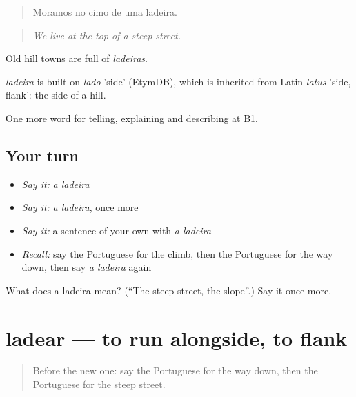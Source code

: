 \begin{quote}
Moramos no cimo de uma ladeira.
\end{quote}

\begin{quote}
\emph{We live at the top of a steep street.}
\end{quote}

Old hill towns are full of \emph{ladeiras}.

\begin{cousinweb}
\emph{ladeira} is built on \emph{lado} 'side' (EtymDB), which is inherited from Latin \emph{latus} 'side, flank': the side of a hill.
\end{cousinweb}

\begin{grammarlens}[title={What you've built}]
One more word for telling, explaining and describing at B1.
\end{grammarlens}

\subsection*{Your turn}
\begin{itemize}
\raggedright
  \item \emph{Say it:} \emph{a ladeira}
  \item \emph{Say it:} \emph{a ladeira}, once more
  \item \emph{Say it:} a sentence of your own with \emph{a ladeira}
  \item \emph{Recall:} say the Portuguese for the climb, then the Portuguese for the way down, then say \emph{a ladeira} again
\end{itemize}

\begin{tcolorbox}[breakable,colback=teal!4,colframe=teal!35!black,title={Before you move on}]
What does a ladeira mean? (\textquotedblleft{}The steep street, the slope\textquotedblright{}.) Say it once more.
\end{tcolorbox}
\section[ladear]{ladear — to run alongside, to flank}

\label{lesson:PT-C438-ladear}



\begin{quote}
Before the new one: say the Portuguese for the way down, then the Portuguese for the steep street.
\end{quote}

